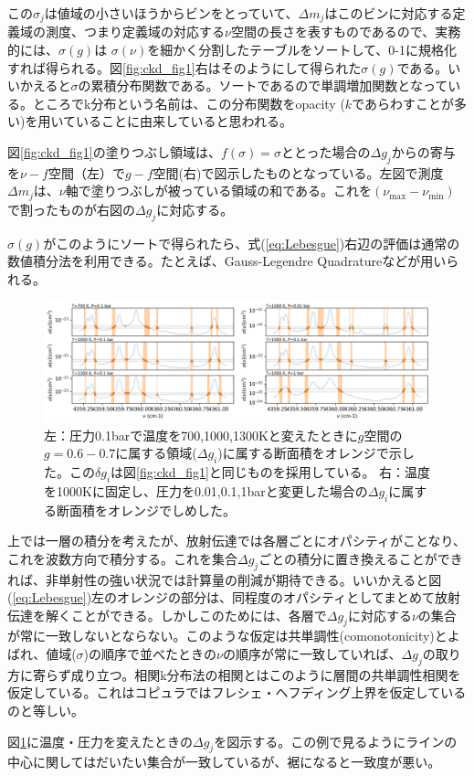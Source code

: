 この$\sigma_j$は値域の小さいほうからビンをとっていて、$\Delta m_j$はこのビンに対応する定義域の測度、つまり定義域の対応する$\nu$空間の長さを表すものであるので、実務的には、$\sigma(g)$は $\sigma(\nu)$を細かく分割したテーブルをソートして、0-1に規格化すれば得られる。図\ref{fig:ckd_fig1}右はそのようにして得られた$\sigma(g)$である。いいかえると$\sigma$の累積分布関数である。ソートであるので単調増加関数となっている。ところでk分布という名前は、この分布関数をopacity ($k$であらわすことが多い)を用いていることに由来していると思われる。

図\ref{fig:ckd_fig1}の塗りつぶし領域は、$f (\sigma) = \sigma$ととった場合の$\Delta g_j$からの寄与を$\nu-f$空間（左）で$g-f$空間(右)で図示したものとなっている。左図で測度$\Delta m_j$は、$\nu$軸で塗りつぶしが被っている領域の和である。これを$(\nu_\mathrm{max} - \nu_\mathrm{min})$で割ったものが右図の$\Delta g_j$に対応する。

$\sigma(g)$がこのようにソートで得られたら、式(\ref{eq:Lebesgue})右辺の評価は通常の数値積分法を利用できる。たとえば、Gauss-Legendre Quadratureなどが用いられる。


\begin{figure}[!h]
    \centering
    \includegraphics[width=1.0\linewidth]{fig/ckd/corrk_corr.png}
    \caption{左：圧力0.1barで温度を700,1000,1300Kと変えたときに$g$空間の$g=0.6-0.7$に属する領域($\Delta g_i$)に属する断面積をオレンジで示した。この$\delta g_i$は図\ref{fig:ckd_fig1}と同じものを採用している。 右：温度を1000Kに固定し、圧力を0.01,0.1,1barと変更した場合の$\Delta g_i$に属する断面積をオレンジでしめした。}
    \label{fig:ckd_fig2}
\end{figure}

上では一層の積分を考えたが、放射伝達では各層ごとにオパシティがことなり、これを波数方向で積分する。これを集合$\Delta g_j$ごとの積分に置き換えることができれば、非単射性の強い状況では計算量の削減が期待できる。いいかえると図(\ref{eq:Lebesgue})左のオレンジの部分は、同程度のオパシティとしてまとめて放射伝達を解くことができる。しかしこのためには、各層で$\Delta g_j$に対応する$\nu$の集合が常に一致しないとならない。このような仮定は共単調性(comonotonicity)とよばれ、値域($\sigma$)の順序で並べたときの$\nu$の順序が常に一致していれば、$\Delta g_j$の取り方に寄らず成り立つ。相関k分布法の相関とはこのように層間の共単調性相関を仮定している。これはコピュラではフレシェ・ヘフディング上界を仮定しているのと等しい。

図\ref{fig:ckd_fig2}に温度・圧力を変えたときの$\Delta g_j$を図示する。この例で見るようにラインの中心に関してはだいたい集合が一致しているが、裾になると一致度が悪い。












